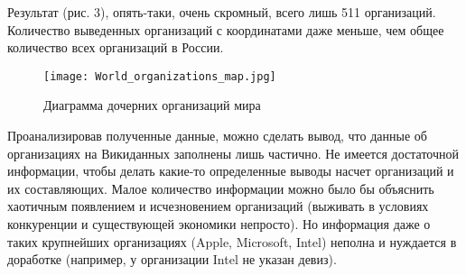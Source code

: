 Результат (рис. 3), опять-таки, очень скромный, всего лишь 511 организаций. Количество выведенных организаций с координатами даже меньше, чем общее количество всех организаций в России.

\begin{figure}[h]
	\texttt{[image: World\_organizations\_map.jpg]}
	\centering
	\caption{Диаграмма дочерних организаций мира}
	\centering
\end{figure}

Проанализировав полученные данные, можно сделать вывод, что данные об организациях на Викиданных заполнены лишь частично. Не имеется достаточной информации, чтобы делать какие-то определенные выводы насчет организаций и их составляющих. Малое количество информации можно было бы объяснить хаотичным появлением и исчезновением организаций (выживать в условиях конкуренции и существующей экономики непросто). Но информация даже о таких крупнейших организациях (Apple, Microsoft, Intel) неполна и нуждается в доработке (например, у организации Intel не указан девиз).